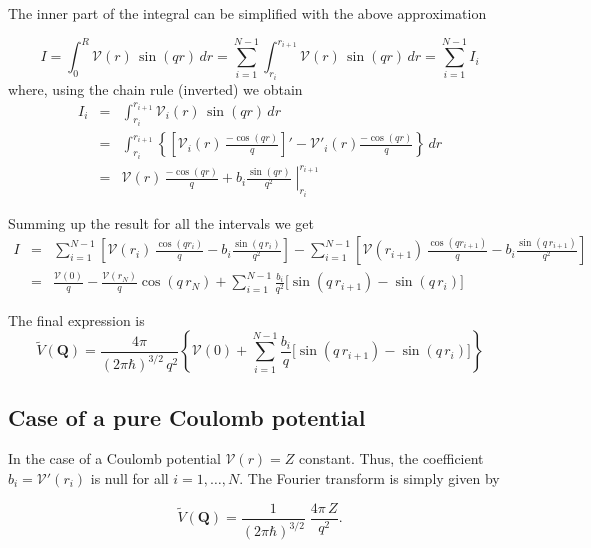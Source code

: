 The inner part of the integral can be simplified with the above
approximation

\begin{equation}
I = \int_{0}^{R} \mathcal{V}(r) \, \sin{(q r)}\, d r =
\sum_{i=1}^{N-1} \int_{r_{i}}^{r_{i+1}} \mathcal{V}(r) \, \sin{(q r)}\,
d r = \sum_{i=1}^{N-1} I_{i}
\end{equation}
where, using the chain rule (inverted) we obtain
\begin{eqnarray*}
I_{i} &=& \int_{r_{i}}^{r_{i+1}} \mathcal{V}_{i}(r) \, \sin{(q r)}
\,d r
\\
&=& \int_{r_{i}}^{r_{i+1}}  \left\{ \left[\mathcal{V}_{i}(r)
\,\frac{-\cos{(q r)}}{q} \right]' - \mathcal{V}'_{i}(r) \frac{-\cos{(q
r)}}{q} \right\} \,d r
\\
&=& \left. \mathcal{V}(r) \,\frac{-\cos{(q r)}}{q}  + b_{i}
\frac{\sin{(q r)}}{q^{2}} \; \right| _{r_{i}}^{r_{i+1}}
\end{eqnarray*}



Summing up the result for all the intervals we get
\begin{eqnarray}
I &=& \sum_{i=1}^{N-1}\left[  \mathcal{V}(r_{i}) \,\frac{\cos{(q
r_{i})}}{q} - b_{i} \frac{\sin{(q\, r_{i})}}{q^{2}} \right] -
\sum_{i=1}^{N-1}\left[ \mathcal{V}(r_{i+1}) \,\frac{\cos{(q
r_{i+1})}}{q}  - b_{i} \frac{\sin{(q\, r_{i+1})}}{q^{2}} \right]
 \\
&=&  \frac{\mathcal{V}(0)}{q} - \frac{\mathcal{V}(r_{N})}{q} \cos{(q \,
r_{N})} + \sum_{i=1}^{N-1}  \frac{b_{i}}{q^{2}} \Big[ \sin{(q\,
r_{i+1})}-\sin{(q \, r_{i})} \Big]
\end{eqnarray}

The final expression is
\begin{equation}\label{Q:apFTV2}
\tilde{V}(\bm{Q}) =\frac{4 \pi}{(2 \pi \hbar)^{3/2} \, q^2} \left\{
\mathcal{V}(0) + \sum_{i=1}^{N-1}  \frac{b_{i}}{q} \Big[ \sin{(q \,
r_{i+1})}-\sin{(q \, r_{i})} \Big] \right\}
\end{equation}

\subsection*{Case of a pure Coulomb potential}

In the case of a Coulomb potential  $\mathcal{V}(r) = Z$ constant.
Thus, the coefficient $b_{i}= \mathcal{V}'(r_{i})$ is null for all
$i=1, \ldots, N$. The Fourier transform is simply given by

\[
\tilde{V}(\bm{Q}) =\frac{1}{(2 \pi \hbar)^{3/2} }\; \frac{4 \pi \, Z}{
q^2} .
\]

